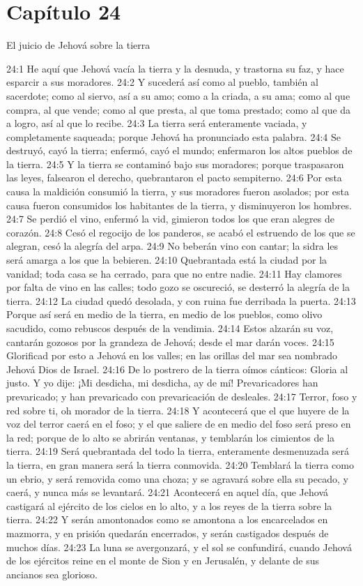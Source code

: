 \section*{Capítulo 24 }
El juicio de Jehová sobre la tierra 
 
24:1 He aquí que Jehová vacía la tierra y la desnuda, y trastorna su faz, y hace esparcir a sus moradores. 
24:2 Y sucederá así como al pueblo, también al sacerdote; como al siervo, así a su amo; como a la criada, a su ama; como al que compra, al que vende; como al que presta, al que toma prestado; como al que da a logro, así al que lo recibe. 
24:3 La tierra será enteramente vaciada, y completamente saqueada; porque Jehová ha pronunciado esta palabra. 
24:4 Se destruyó, cayó la tierra; enfermó, cayó el mundo; enfermaron los altos pueblos de la tierra. 
24:5 Y la tierra se contaminó bajo sus moradores; porque traspasaron las leyes, falsearon el derecho, quebrantaron el pacto sempiterno. 
24:6 Por esta causa la maldición consumió la tierra, y sus moradores fueron asolados; por esta causa fueron consumidos los habitantes de la tierra, y disminuyeron los hombres. 
24:7 Se perdió el vino, enfermó la vid, gimieron todos los que eran alegres de corazón. 
24:8 Cesó el regocijo de los panderos, se acabó el estruendo de los que se alegran, cesó la alegría del arpa. 
24:9 No beberán vino con cantar; la sidra les será amarga a los que la bebieren. 
24:10 Quebrantada está la ciudad por la vanidad; toda casa se ha cerrado, para que no entre nadie. 
24:11 Hay clamores por falta de vino en las calles; todo gozo se oscureció, se desterró la alegría de la tierra. 
24:12 La ciudad quedó desolada, y con ruina fue derribada la puerta. 
24:13 Porque así será en medio de la tierra, en medio de los pueblos, como olivo sacudido, como rebuscos después de la vendimia. 
24:14 Estos alzarán su voz, cantarán gozosos por la grandeza de Jehová; desde el mar darán voces. 
24:15 Glorificad por esto a Jehová en los valles; en las orillas del mar sea nombrado Jehová Dios de Israel. 
24:16 De lo postrero de la tierra oímos cánticos: Gloria al justo. Y yo dije: ¡Mi desdicha, mi desdicha, ay de mí! Prevaricadores han prevaricado; y han prevaricado con prevaricación de desleales. 
24:17 Terror, foso y red sobre ti, oh morador de la tierra. 
24:18 Y acontecerá que el que huyere de la voz del terror caerá en el foso; y el que saliere de en medio del foso será preso en la red; porque de lo alto se abrirán ventanas, y temblarán los cimientos de la tierra. 
24:19 Será quebrantada del todo la tierra, enteramente desmenuzada será la tierra, en gran manera será la tierra conmovida. 
24:20 Temblará la tierra como un ebrio, y será removida como una choza; y se agravará sobre ella su pecado, y caerá, y nunca más se levantará. 
24:21 Acontecerá en aquel día, que Jehová castigará al ejército de los cielos en lo alto, y a los reyes de la tierra sobre la tierra. 
24:22 Y serán amontonados como se amontona a los encarcelados en mazmorra, y en prisión quedarán encerrados, y serán castigados después de muchos días. 
24:23 La luna se avergonzará, y el sol se confundirá, cuando Jehová de los ejércitos reine en el monte de Sion y en Jerusalén, y delante de sus ancianos sea glorioso. 
